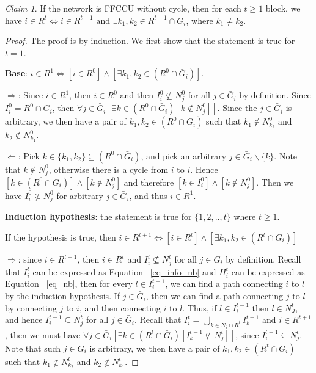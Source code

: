 \documentclass[12pt,letterpaper]{article}
\theoremstyle{definition}
\theoremstyle{remark}
\theoremstyle{claim}
\newtheorem{claim}{Claim}
\begin{document}
\begin{claim}
\label{lemma1}
If the network is FFCCU without cycle, then for each $t\geq 1$ block, we have $i\in R^t\Leftrightarrow i\in R^{t-1} \text{ and } \exists k_1,k_2\in R^{t-1}\cap \bar{G}_i$, where $k_1\neq k_2$.
\end{claim}
\begin{proof}
The proof is by induction. We first show that the statement is true for $t=1$. 

\textbf{Base}: $i\in R^1\Leftrightarrow [i\in R^0] \wedge [\exists k_1,k_2\in (R^0\cap \bar{G}_i)]$. 

$\Rightarrow$: Since $i\in R^1$, then $i\in R^0$ and then $I^0_i\nsubseteq N^0_j$ for all $j\in \bar{G}_i$ by definition. Since $I^0_i=R^0\cap G_i$, then $\forall j\in \bar{G}_i [\exists k\in (R^0\cap \bar{G}_i) [k\notin N^0_j]]$. Since the $j\in \bar{G}_i$ is arbitrary,  we then have a pair of $k_1, k_2 \in (R^0\cap \bar{G}_i)$ such that $k_1\notin N^0_{k_2}$ and $k_2\notin N^0_{k_1}$.

$\Leftarrow$: Pick $k\in \{k_1,k_2\}\subseteq (R^0\cap \bar{G}_i)$, and pick an arbitrary $j\in \bar{G}_i\backslash \{k\}$. Note that $k\notin N^0_j$, otherwise there is a cycle from $i$ to $i$. Hence $[k\in (R^0\cap \bar{G}_i)] \wedge [k\notin N^0_j]$ and therefore $[k\in I^0_i] \wedge [k\notin N^0_j]$. Then we have $I^0_i\nsubseteq N^0_j$ for arbitrary $j\in \bar{G}_i$, and thus $i\in R^1$.

\textbf{Induction hypothesis}: the statement is true for $\{1,2,..,t\}$ where $t\geq 1$. 


If the hypothesis is true, then $i\in R^{t+1}\Leftrightarrow [i\in R^{t}] \wedge [\exists k_1,k_2\in (R^{t}\cap \bar{G}_i)]$


$\Rightarrow$: since $i\in R^{t+1}$, then $i\in R^t$ and $I^t_i\nsubseteq N^t_j$ for all $j\in \bar{G}_i$ by definition. Recall that $I^t_i$ can be expressed as Equation ~\ref{eq_info_nb} and $H^t_i$ can be expressed as Equation ~\ref{eq_nb}, then for every $l\in I^{t-1}_i$, we can find a path connecting $i$ to $l$ by the induction hypothesis. If $j\in \bar{G}_i$, then we can find a path connecting $j$ to $l$ by connecting $j$ to $i$, and then connecting $i$ to $l$. Thus, if $l\in I^{t-1}_i$ then $l\in N^t_J$, and hence $I^{t-1}_i\subseteq N^t_{j}$ for all $j\in \bar{G}_i$. Recall that $I^t_i = \bigcup_{k\in N_i\cap R^t}I^{t-1}_k$ and $i\in R^{t+1}$, then we must have $\forall j\in \bar{G}_i [\exists k\in (R^t\cap \bar{G}_i)[ I^{t-1}_k\nsubseteq N^t_j]]$, since $I^{t-1}_i\subseteq N^t_{j}$. Note that such $j\in \bar{G}_i$ is arbitrary,  we then have a pair of $k_1, k_2 \in (R^{t}\cap \bar{G}_i)$ such that $k_1\notin N^t_{k_2}$ and $k_2\notin N^t_{k_1}$.
\bigskip


\end{proof}
\end{document}
